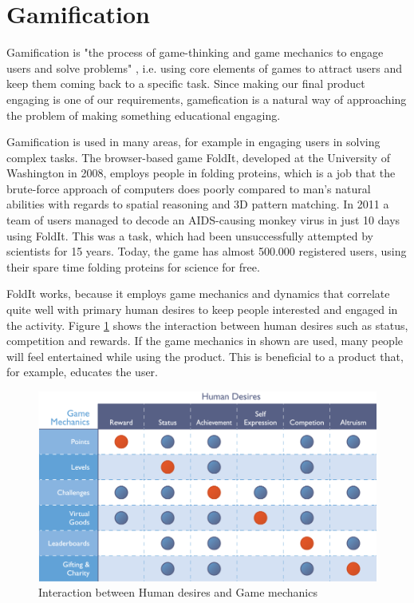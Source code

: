 \section{Gamification}
\label{sec:gamification}
Gamification is "the process of game-thinking and game mechanics to engage users and solve problems" \cite{Zichermann2011}, i.e. using core elements of games to attract users and keep them coming back to a specific task. Since making our final product engaging is one of our requirements, gamefication is a natural way of approaching the problem of making something educational engaging.\newline

Gamification is used in many areas, for example in engaging users in solving complex tasks. The browser-based game FoldIt, developed at the University of Washington in 2008, employs people in folding proteins, which is a job that the brute-force approach of computers does poorly compared to man's natural abilities with regards to spatial reasoning and 3D pattern matching. In 2011 a team of users managed to decode an AIDS-causing monkey virus in just 10 days using FoldIt. This was a task, which had been unsuccessfully attempted by scientists for 15 years.\cite{Huff2011} Today, the game has almost 500.000 registered users, using their spare time folding proteins for science for free.\cite{FoldIt2013}

FoldIt works, because it employs game mechanics and dynamics that correlate quite well with primary human desires to keep people interested and engaged in the activity.
Figure \ref{fig:bunchball} shows the interaction between human desires such as status, competition and rewards. If the game mechanics in shown are used, many people will feel entertained while using the product. This is beneficial to a product that, for example, educates the user. 

\begin{figure}[h]
  \centering
    \includegraphics[width=\textwidth]{img/bunchball.png}
  \caption{Interaction between Human desires and Game mechanics}
  \label{fig:bunchball}
\end{figure}

